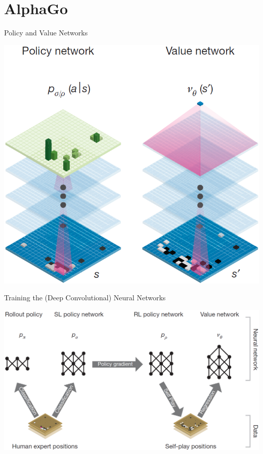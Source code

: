 \documentclass{beamer}
\begin{document}

  \section{AlphaGo}
  {

    \begin{frame}{Policy and Value Networks}
      \begin{center}
        \includegraphics[height=.85\textheight]{../img/policy_and_value_network.png}
      \end{center}
    \end{frame}

    \begin{frame}{Training the (Deep Convolutional) Neural Networks}
      \begin{center}
        \includegraphics[width=\textwidth]{../img/neural_nets_pipeline.png}
      \end{center}
    \end{frame}
  }
\end{document}
